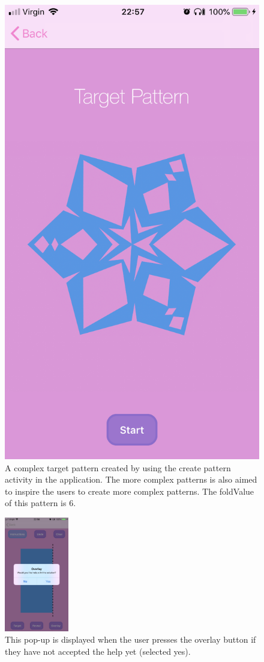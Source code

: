 \documentclass[11pt]{article}
\begin{document}
\begin{figure}[!ht]
\begin{minipage}{0.45\textwidth}
                            \includegraphics[width=0.7\linewidth]{KiriZen/complexTarget}
                            \caption{A complex target pattern created by using the create pattern activity in the application. The more complex patterns is also aimed to inspire the users to create more complex patterns.  The foldValue of this pattern is 6.}
                            \label{fig:kiriZen-complexTarget}
                        \end{minipage}
                    \end{figure}
                    
                    \begin{figure}
                        \centering
                        \includegraphics[width=0.25\textwidth]{KiriZen/overlayPopUp.jpeg}
                        \caption{This pop-up is displayed when the user presses the overlay button if they have not accepted the help yet (selected yes).}
                        \label{fig:kiriZen-overlayPopUp}
                    \end{figure}
                    
\end{document}
